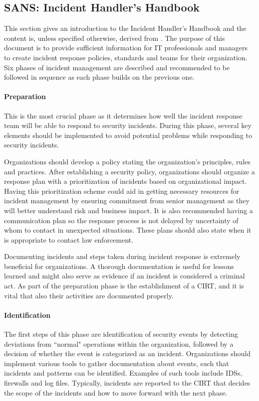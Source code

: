 \subsection{SANS: Incident Handler's Handbook}
This section gives an introduction to the Incident Handler's Handbook and the content is, unless specified otherwise, derived from \cite{SANShandbook}. The purpose of this document is to provide sufficient information for IT professionals and managers to create incident response policies, standards and teams for their organization. Six phases of incident management are described and recommended to be followed in sequence as each phase builds on the previous one. 

\paragraph{Preparation} 
This is the most crucial phase as it determines how well the incident response team will be able to respond to security incidents. During this phase, several key elements should be implemented to avoid potential problems while responding to security incidents.

Organizations should develop a policy stating the organization's principles, rules and practices. After establishing a security policy, organizations should organize a response plan with a prioritization of incidents based on organizational impact. Having this prioritization scheme could aid in getting necessary resources for incident management by ensuring commitment from senior management as they will better understand risk and business impact. It is also recommended having a communication plan so the response process is not delayed by uncertainty of whom to contact in unexpected situations. These plans should also state when it is appropriate to contact law enforcement.

Documenting incidents and steps taken during incident response is extremely beneficial for organizations. A thorough documentation is useful for lessons learned and might also serve as evidence if an incident is considered a criminal act. As part of the preparation phase is the establishment of a \ac{CIRT}, and it is vital that also their activities are documented properly. 

\paragraph{Identification} 
The first steps of this phase are identification of security events by detecting deviations from ``normal" operations within the organization, followed by a decision of whether the event is categorized as an incident. Organizations should implement various tools to gather documentation about events, such that incidents and patterns can be identified. Examples of such tools include \acp{IDS}, firewalls and log files. Typically, incidents are reported to the \ac{CIRT} that decides the scope of the incidents and how to move forward with the next phase.

